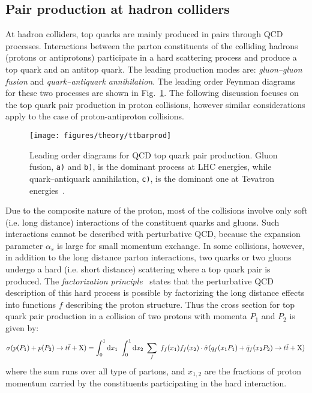 \subsection{Pair production at hadron colliders}
\label{sec:topprod}

At hadron colliders, top quarks are mainly produced in pairs through QCD
processes. Interactions between the parton constituents of the
colliding hadrons (protons or antiprotons) participate in a hard
scattering process and produce a top quark and an antitop quark. The
leading production modes are: {\it gluon--gluon fusion} and {\it
  quark--antiquark annihilation}. The leading order Feynman diagrams
for these two processes are shown in Fig.~\ref{fig:ttbarprod}. The
following discussion focuses on the top quark pair production in proton
collisions, however similar considerations apply to the case of
proton-antiproton collisions.

\begin{figure}[!htb]\centering
  \texttt{[image: figures/theory/ttbarprod]}
  \caption{Leading order diagrams for QCD top quark pair production.
    Gluon fusion, {\tt a)} and {\tt b)}, is the dominant process at
    LHC energies, while quark--antiquark annihilation, {\tt c)}, is
    the dominant one at Tevatron energies~\cite{Fiorini:2012fe}.} 
  \label{fig:ttbarprod}
\end{figure}

Due to the composite nature of the proton, most of the
collisions involve only soft (i.e. long distance) interactions of the
constituent quarks and gluons. Such interactions cannot be described
with perturbative QCD, because the expansion parameter $\alpha_s$ is
large for small momentum exchange.
In some collisions, however, in addition to the long distance parton
interactions, two quarks or two gluons undergo a hard (i.e. short
distance) scattering where a top quark pair is produced. 
The {\it factorization principle}~\cite{factorprinciple} states that
the perturbative QCD description of this hard process is possible by
factorizing the long distance effects into functions $f$ describing the
proton structure. Thus the cross section for top quark pair
production in a collision of two protons with momenta $P_1$ and $P_2$
is given by: 
\begin{equation}
  \sigma(p(P_1)+p(P_2)\to\mbox{$t\bar{t}$}{}+{\rm X})
  = 
  \int_0^1{\rm d}x_1
  ~\int_0^1{\rm d}x_2
  ~\sum_f~ f_f(x_1) f_f(x_2)
  \cdot{}\hat{\sigma}(q_f(x_1P_1)+\bar{q}_f(x_2P_2)\to\mbox{$t\bar{t}$}{}+{\rm
    X})
  \phantom{,}
  \label{eq:ttbarxs}
\end{equation}
where the sum runs over all type of partons, and $x_{1,2}$ are the
fractions of proton momentum carried by the constituents participating
in the hard interaction. 

